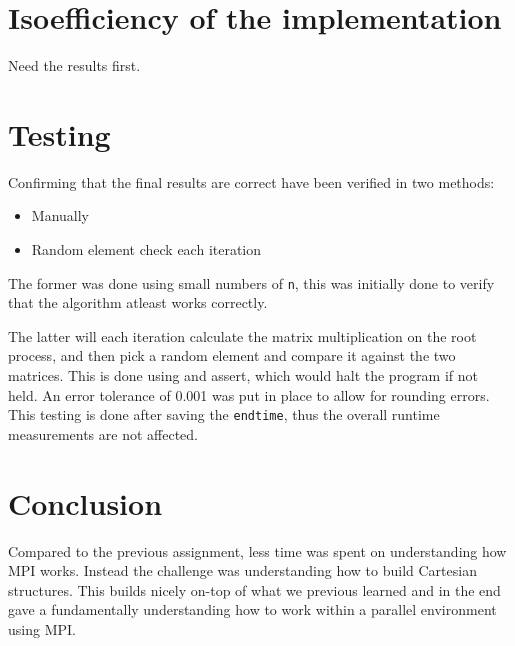 \documentclass[a4paper,11pt,oneside]{book}
\begin{document}

\chapter{Isoefficiency of the implementation}
Need the results first.

\chapter{Testing}
Confirming that the final results are correct have been verified in two methods:

\begin{itemize}
\item Manually
\item Random element check each iteration
\end{itemize}

The former was done using small numbers of \verb!n!, this was initially done to verify that the algorithm atleast works correctly.

The latter will each iteration calculate the matrix multiplication on the root process, and then pick a random element and compare it against the two matrices. This is done using and assert, which would halt the program if not held. An error tolerance of 0.001 was put in place to allow for rounding errors.
This testing is done after saving the \verb!endtime!, thus the overall runtime measurements are not affected.

\chapter{Conclusion}
Compared to the previous assignment, less time was spent on understanding how MPI works. Instead the challenge was understanding how to build Cartesian structures. This builds nicely on-top of what we previous learned and in the end gave a fundamentally understanding how to work within a parallel environment using MPI.
\end{document}

